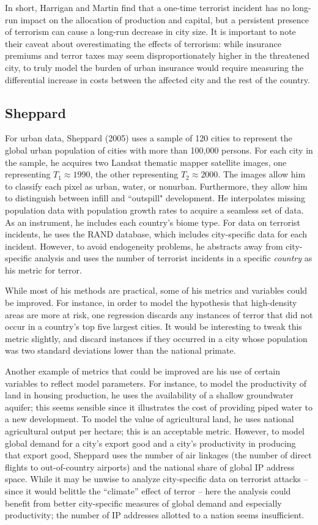 \documentclass[preprint,2p,12pt]{elsarticle}
\begin{document}
In short, Harrigan and Martin find that a one-time terrorist incident has no long-run impact on the allocation of production and capital, but a persistent presence of terrorism can cause a long-run decrease in city size.
It is important to note their caveat about overestimating the effects of terrorism: while insurance premiums and terror taxes may seem disproportionately higher in the threatened city, to truly model the burden of urban insurance would require measuring the differential increase in costs between the affected city and the rest of the country.

\subsection{Sheppard}
For urban data, Sheppard (2005) uses a sample of 120 cities to represent the global urban population of cities with more than 100,000 persons.
For each city in the sample, he acquires two Landsat thematic mapper satellite images, one representing $T_1 \approx 1990$, the other representing $T_2 \approx 2000$.
The images allow him to classify each pixel as urban, water, or nonurban.
Furthermore, they allow him to distinguish between infill and ``outspill" development.
He interpolates missing population data with population growth rates to acquire a seamless set of data.
As an instrument, he includes each country's biome type.
For data on terrorist incidents, he uses the RAND database, which includes city-specific data for each incident.
However, to avoid endogeneity problems, he abstracts away from city-specific analysis and uses the number of terrorist incidents in a specific \emph{country} as his metric for terror.

While most of his methods are practical, some of his metrics and variables could be improved.
For instance, in order to model the hypothesis that high-density areas are more at risk, one regression discards any instances of terror that did not occur in a country's top five largest cities.
It would be interesting to tweak this metric slightly, and discard instances if they occurred in a city whose population was two standard deviations lower than the national primate.

Another example of metrics that could be improved are his use of certain variables to reflect model parameters.
For instance, to model the productivity of land in housing production, he uses the availability of a shallow groundwater aquifer; this seems sensible since it illustrates the cost of providing piped water to a new development.
To model the value of agricultural land, he uses national agricultural output per hectare; this is an acceptable metric.
However, to model global demand for a city's export good and a city's productivity in producing that export good, Sheppard uses the number of air linkages (the number of direct flights to out-of-country airports) and the national share of global IP address space.
While it may be unwise to analyze city-specific data on terrorist attacks -- since it would belittle the ``climate'' effect of terror -- here the analysis could benefit from better city-specific measures of global demand and especially productivity; the number of IP addresses allotted to a nation seems insufficient.
\end{document}
